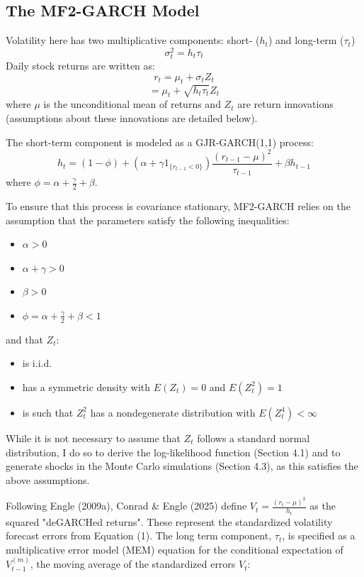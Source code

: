 \documentclass[12pt]{article}
\begin{document}
\subsection{The MF2-GARCH Model}
Volatility here has two multiplicative components: short- ($h_t$) and long-term ($\tau_t$)
\begin{equation}
\nonumber
\sigma_t^2=h_t\tau_t
\end{equation}
Daily stock returns are written as:
\begin{equation}
\nonumber
r_t=\mu_t+\sigma_tZ_t
\end{equation}
\begin{equation}
\nonumber
=\mu_t+\sqrt{h_t\tau_t}Z_t
\end{equation}
where $\mu$ is the unconditional mean of returns and $Z_t$ are return innovations (assumptions about these innovations are detailed below).\par
\vspace{5mm}
\noindent The short-term component is modeled as a GJR-GARCH(1,1) process:
\begin{equation}
h_t=(1-\phi)+(\alpha+\gamma1_{\{r_{t-1}<0\}})\frac{(r_{t-1}-\mu)^2}{\tau_{t-1}}+\beta h_{t-1}
\end{equation}
where $\phi=\alpha+\frac{\gamma}{2}+\beta$.\par
To ensure that this process is covariance stationary, MF2-GARCH relies on the assumption that the parameters satisfy the following inequalities:
\begin{itemize}
\item$\alpha>0$
\item$\alpha+\gamma>0$
\item$\beta>0$
\item$\phi=\alpha+\frac{\gamma}{2}+\beta<1$
\end{itemize}
and that $Z_t$:
\begin{itemize}
\item is i.i.d.
\item has a symmetric density with $E(Z_t)=0$ and $E(Z_t^2)=1$
\item is such that $Z_t^2$ has a nondegenerate distribution with $E(Z_t^4)<\infty$
\end{itemize}
While it is not necessary to assume that $Z_t$ follows a standard normal distribution, I do so to derive the log-likelihood function (Section 4.1) and to generate shocks in the Monte Carlo simulations (Section 4.3), as this satisfies the above assumptions.\par
Following Engle (2009a), Conrad \& Engle (2025) define $V_t=\frac{(r_t-\mu)^2}{h_t}$ as the squared "deGARCHed returns". These represent the standardized volatility forecast errors from Equation (1). The long term component, $\tau_t$, is specified as a multiplicative error model (MEM) equation for the conditional expectation of $V_{t-1}^{(m)}$, the moving average of the standardized errors $V_t$:
\end{document}
